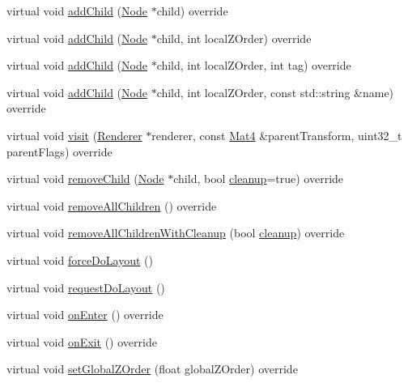 \begin{DoxyCompactItemize}
\item 
virtual void \hyperlink{classui_1_1Layout_ae08449caf813144448cc3841b1a6dfee}{add\+Child} (\hyperlink{classNode}{Node} $\ast$child) override
\item 
virtual void \hyperlink{classui_1_1Layout_aa9947ec25c709fa839fdec1795ae2a2c}{add\+Child} (\hyperlink{classNode}{Node} $\ast$child, int local\+Z\+Order) override
\item 
virtual void \hyperlink{classui_1_1Layout_af456e16a833450c52982b487d97b7134}{add\+Child} (\hyperlink{classNode}{Node} $\ast$child, int local\+Z\+Order, int tag) override
\item 
virtual void \hyperlink{classui_1_1Layout_a59f9ed41b62760ee7edf948d633e3cd1}{add\+Child} (\hyperlink{classNode}{Node} $\ast$child, int local\+Z\+Order, const std\+::string \&name) override
\item 
virtual void \hyperlink{classui_1_1Layout_a7857b109e0d674106c9fe22830ef4076}{visit} (\hyperlink{classRenderer}{Renderer} $\ast$renderer, const \hyperlink{classMat4}{Mat4} \&parent\+Transform, uint32\+\_\+t parent\+Flags) override
\item 
virtual void \hyperlink{classui_1_1Layout_a3a391ace9855a825523cdc882c271abe}{remove\+Child} (\hyperlink{classNode}{Node} $\ast$child, bool \hyperlink{classProtectedNode_a5462a6202b458193c1881bcdcc5be78d}{cleanup}=true) override
\item 
virtual void \hyperlink{classui_1_1Layout_ace8bad280eb1b1df51211cca73131530}{remove\+All\+Children} () override
\item 
virtual void \hyperlink{classui_1_1Layout_a7dcfdbe18bfc9e55169e957597aa19ca}{remove\+All\+Children\+With\+Cleanup} (bool \hyperlink{classProtectedNode_a5462a6202b458193c1881bcdcc5be78d}{cleanup}) override
\item 
virtual void \hyperlink{classui_1_1Layout_a9e690a2f773cc3eb77f0cff5959782e1}{force\+Do\+Layout} ()
\item 
virtual void \hyperlink{classui_1_1Layout_af35d0efa2d078a144a3cd2c119f01f3b}{request\+Do\+Layout} ()
\item 
virtual void \hyperlink{classui_1_1Layout_ad3edf411791596999e99059861c0097a}{on\+Enter} () override
\item 
virtual void \hyperlink{classui_1_1Layout_ad6be3b3eb4ca53dcbd3eb1ca966299ff}{on\+Exit} () override
\item 
virtual void \hyperlink{classui_1_1Layout_a5ac5023a3f35c0ba03769ef6794c8537}{set\+Global\+Z\+Order} (float global\+Z\+Order) override
\item 

\end{DoxyCompactItemize}
